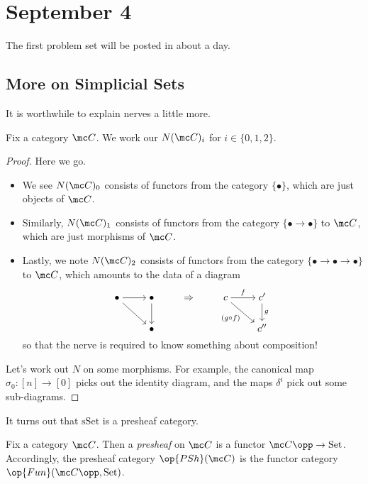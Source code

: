 \documentclass[../notes.tex]{subfiles}
\begin{document}
\section{September 4}
The first problem set will be posted in about a day.

\subsection{More on Simplicial Sets}
It is worthwhile to explain nerves a little more.
\begin{exe}
	Fix a category $\mc C$. We work our $N(\mc C)_i$ for $i\in\{0,1,2\}$.
\end{exe}
\begin{proof}
	Here we go.
	\begin{itemize}
		\item We see $N(\mc C)_0$ consists of functors from the category $\{\bullet\}$, which are just objects of $\mc C$.
		\item Similarly, $N(\mc C)_1$ consists of functors from the category $\{\bullet\to\bullet\}$ to $\mc C$, which are just morphisms of $\mc C$.
		\item Lastly, we note $N(\mc C)_2$ consists of functors from the category $\{\bullet\to\bullet\to\bullet\}$ to $\mc C$, which amounts to the data of a diagram
		\[\begin{tikzcd}[cramped]
			\bullet & \bullet & \Rightarrow & c & {c'} \\
			& \bullet &&& {c''}
			\arrow[from=1-1, to=1-2]
			\arrow[from=1-1, to=2-2]
			\arrow[from=1-2, to=2-2]
			\arrow["f", from=1-4, to=1-5]
			\arrow["{(g\circ f)}"', from=1-4, to=2-5]
			\arrow["g", from=1-5, to=2-5]
		\end{tikzcd}\]
		so that the nerve is required to know something about composition!
	\end{itemize}
	Let's work out $N$ on some morphisms. For example, the canonical map $\sigma_0\colon[n]\to[0]$ picks out the identity diagram, and the maps $\delta^i$ pick out some sub-diagrams.
\end{proof}
It turns out that $\mathrm{sSet}$ is a presheaf category.
\begin{definition}[presheaf]
	Fix a category $\mc C$. Then a \textit{presheaf} on $\mc C$ is a functor $\mc C\opp\to\mathrm{Set}$. Accordingly, the presheaf category $\op{PSh}(\mc C)$ is the functor category $\op{Fun}(\mc C\opp,\mathrm{Set})$.
\end{definition}
\end{document}
